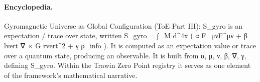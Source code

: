 \paragraph{Encyclopedia.}
Gyromagnetic Universe as Global Configuration (ToE Part III): S\_gyro is an expectation / trace over state, written S\_gyro = ∫\_M d\textasciicircum{}4x ( α F\_μνF\textasciicircum{}μν + β lvert ∇ × G rvert\textasciicircum{}2 + γ ρ\_info ). It is computed as an expectation value or trace over a quantum state, producing an observable. It is built from α, μ, ν, β, ∇, γ, defining S\_gyro. Within the Trawin Zero Point registry it serves as one element of the framework's mathematical narrative.
